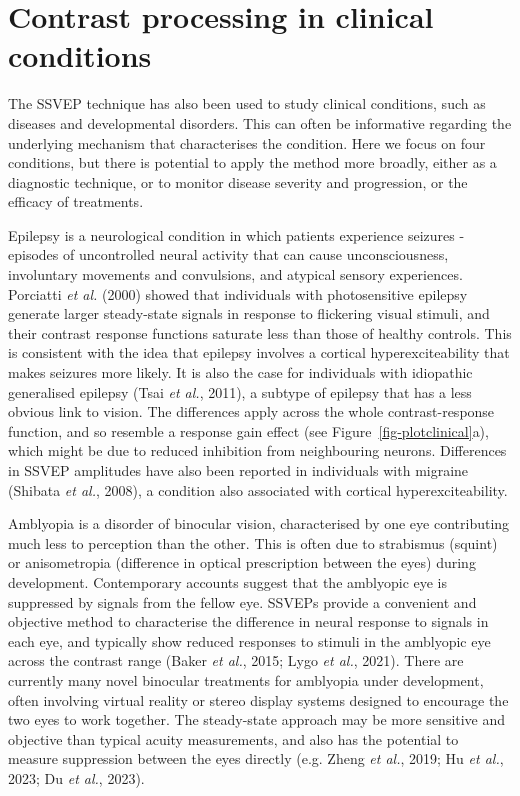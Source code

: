 \documentclass[
  letterpaper,
  DIV=11,
  numbers=noendperiod]{scrartcl}
\begin{document}
\section{Contrast processing in clinical
conditions}\label{contrast-processing-in-clinical-conditions}

The SSVEP technique has also been used to study clinical conditions,
such as diseases and developmental disorders. This can often be
informative regarding the underlying mechanism that characterises the
condition. Here we focus on four conditions, but there is potential to
apply the method more broadly, either as a diagnostic technique, or to
monitor disease severity and progression, or the efficacy of treatments.

Epilepsy is a neurological condition in which patients experience
seizures - episodes of uncontrolled neural activity that can cause
unconsciousness, involuntary movements and convulsions, and atypical
sensory experiences. Porciatti \emph{et al.} (2000) showed that
individuals with photosensitive epilepsy generate larger steady-state
signals in response to flickering visual stimuli, and their contrast
response functions saturate less than those of healthy controls. This is
consistent with the idea that epilepsy involves a cortical
hyperexciteability that makes seizures more likely. It is also the case
for individuals with idiopathic generalised epilepsy (Tsai \emph{et
al.}, 2011), a subtype of epilepsy that has a less obvious link to
vision. The differences apply across the whole contrast-response
function, and so resemble a response gain effect (see
Figure~\ref{fig-plotclinical}a), which might be due to reduced
inhibition from neighbouring neurons. Differences in SSVEP amplitudes
have also been reported in individuals with migraine (Shibata \emph{et
al.}, 2008), a condition also associated with cortical
hyperexciteability.

Amblyopia is a disorder of binocular vision, characterised by one eye
contributing much less to perception than the other. This is often due
to strabismus (squint) or anisometropia (difference in optical
prescription between the eyes) during development. Contemporary accounts
suggest that the amblyopic eye is suppressed by signals from the fellow
eye. SSVEPs provide a convenient and objective method to characterise
the difference in neural response to signals in each eye, and typically
show reduced responses to stimuli in the amblyopic eye across the
contrast range (Baker \emph{et al.}, 2015; Lygo \emph{et al.}, 2021).
There are currently many novel binocular treatments for amblyopia under
development, often involving virtual reality or stereo display systems
designed to encourage the two eyes to work together. The steady-state
approach may be more sensitive and objective than typical acuity
measurements, and also has the potential to measure suppression between
the eyes directly (e.g. Zheng \emph{et al.}, 2019; Hu \emph{et al.},
2023; Du \emph{et al.}, 2023).
\end{document}
